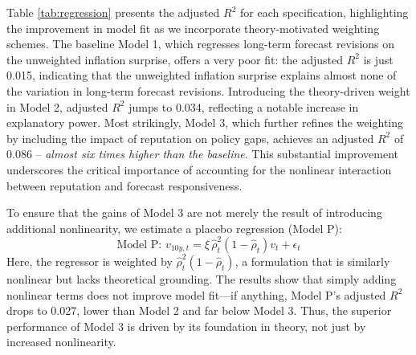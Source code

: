 \documentclass[12pt,letter,leqno]{article}
\theoremstyle{asn}
\theoremstyle{lem}
\theoremstyle{slem}
\theoremstyle{prop}
\theoremstyle{appprop}
\theoremstyle{rem}
\theoremstyle{defn}
\begin{document}
Table \ref{tab:regression} presents the adjusted $R^2$ for each specification, highlighting the improvement in model fit as we incorporate theory-motivated weighting schemes. The baseline Model 1, which regresses long-term forecast revisions on the unweighted inflation surprise, offers a very poor fit: the adjusted $R^2$ is just 0.015, indicating that the unweighted inflation surprise explains almost none of the variation in long-term forecast revisions. Introducing the theory-driven weight in Model 2, adjusted $R^2$ jumps to 0.034, reflecting a notable increase in explanatory power. Most strikingly, Model 3, which further refines the weighting by including the impact of reputation on policy gaps, achieves an adjusted $R^2$ of 0.086 -- \textit{almost six times higher than the baseline}. This substantial improvement underscores the critical importance of accounting for the nonlinear interaction between reputation and forecast responsiveness.

To ensure that the gains of Model 3 are not merely the result of introducing additional nonlinearity, we estimate a placebo regression (Model P):
\begin{equation}
\text{Model P: }v_{10y,t} = \xi\, \widehat{\rho}_t^2 (1-\widehat{\rho}_t) v_t + \epsilon_t
\end{equation}
Here, the regressor is weighted by $\widehat{\rho}_t^2(1-\widehat{\rho}_t)$, a formulation that is similarly nonlinear but lacks theoretical grounding. The results show that simply adding nonlinear terms does not improve model fit—if anything, Model P's adjusted $R^2$ drops to 0.027, lower than Model 2 and far below Model 3. Thus, the superior performance of Model 3 is driven by its foundation in theory, not just by increased nonlinearity.
\end{document}
